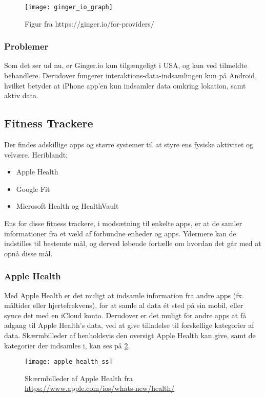 \begin{figure}[h]
\centering
\texttt{[image: ginger\_io\_graph]}
\caption{Figur fra https://ginger.io/for-providers/}
\label{eksisterende_systemer:ginger_io_graf}
\end{figure}

\subsubsection{Problemer}
Som det ser ud nu, er Ginger.io kun tilgængeligt i USA, og kun ved tilmeldte behandlere.
Derudover fungerer interaktions-data-indsamlingen kun på Android, hvilket betyder at iPhone app'en kun indsamler data omkring lokation, samt aktiv data.

\subsection{Fitness Trackere}
Der findes adskillige apps og større systemer til at styre ens fysiske aktivitet og velvære.
Heriblandt;
\begin{itemize}
\item Apple Health\cite{apple_health}
\item Google Fit\cite{google_fit}\cite{google_fit_api}
\item Microsoft Health\cite{ms_health} og HealthVault\cite{ms_health_vault}\cite{ms_health_vault_api}
\end{itemize}

Ens for disse fitness trackere, i modsætning til enkelte apps, er at de samler informationer fra et væld af forbundne enheder og apps.
Ydermere kan de indstilles til bestemte mål, og derved løbende fortælle om hvordan det går med at opnå disse mål.

\subsubsection{Apple Health}
Med Apple Health er det muligt at indsamle information fra andre apps (fx. måltider eller hjertefrekvens), for at samle al data ét sted på sin mobil, eller synce det med en iCloud konto.
Derudover er det muligt for andre apps at få adgang til Apple Health's data, ved at give tilladelse til forskellige kategorier af data.
Skærmbilleder af henholdsvis den oversigt Apple Health kan give, samt de kategorier der indsamles i, kan ses på \cref{eksisterende_systemer:apple_health_ss}.

\begin{figure}
\centering
\texttt{[image: apple\_health\_ss]}
\caption{Skærmbilleder af Apple Health fra \url{https://www.apple.com/ios/whats-new/health/}}
\label{eksisterende_systemer:apple_health_ss}
\end{figure}

